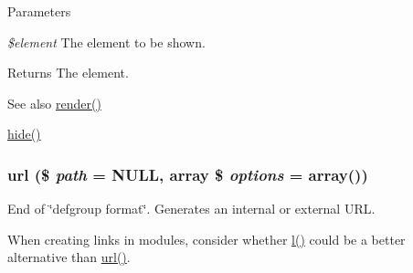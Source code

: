 \begin{DoxyParams}{Parameters}
\item[{\em \$element}]The element to be shown.\end{DoxyParams}
\begin{DoxyReturn}{Returns}
The element.
\end{DoxyReturn}
\begin{DoxySeeAlso}{See also}
\hyperlink{common_8inc_a5f4b2009c1caf78549203cec9b324305}{render()} 

\hyperlink{common_8inc_aa57f04b6e1f5cdc3ed30abf98fd0fd3f}{hide()} 
\end{DoxySeeAlso}
\hypertarget{common_8inc_a43b2a0594431556db49df980801d8807}{
\subsubsection[{url}]{\setlength{\rightskip}{0pt plus 5cm}url (\$ {\em path} = {\ttfamily NULL}, \/  array \$ {\em options} = {\ttfamily array()})}}
\label{common_8inc_a43b2a0594431556db49df980801d8807}
End of \char`\"{}defgroup format\char`\"{}. Generates an internal or external URL.

When creating links in modules, consider whether \hyperlink{common_8inc_ad3b36c06dc46250b8d22b8d0d2e7bd97}{l()} could be a better alternative than \hyperlink{common_8inc_a43b2a0594431556db49df980801d8807}{url()}.


